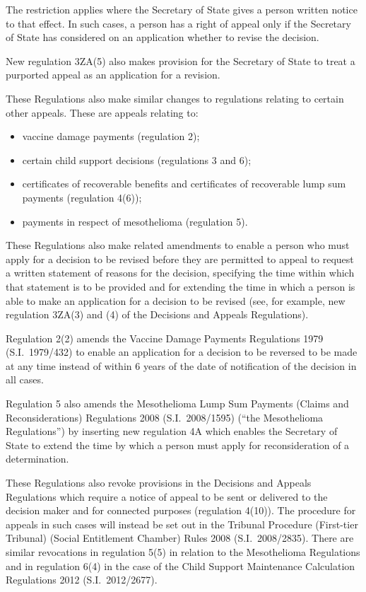 \documentclass[12pt,a4paper]{article}
\begin{document}
The restriction applies where the Secretary of State gives a person written notice to that effect. In such cases, a person has a right of appeal only if the Secretary of State has considered on an application whether to revise the decision.

New regulation 3ZA(5) also makes provision for the Secretary of State to treat a purported appeal as an application for a revision.

These Regulations also make similar changes to regulations relating to certain other appeals. These are appeals relating to:
\begin{itemize}\item
    vaccine damage payments (regulation 2);
\item
    certain child support decisions (regulations 3 and 6);
\item
    certificates of recoverable benefits and certificates of recoverable lump sum payments (regulation 4(6));
\item
    payments in respect of mesothelioma (regulation 5). 
\end{itemize}

These Regulations also make related amendments to enable a person who must apply for a decision to be revised before they are permitted to appeal to request a written statement of reasons for the decision, specifying the time within which that statement is to be provided and for extending the time in which a person is able to make an application for a decision to be revised (see, for example, new regulation 3ZA(3) and (4) of the Decisions and Appeals Regulations).

Regulation 2(2) amends the Vaccine Damage Payments Regulations 1979 (S.I.~1979/432) to enable an application for a decision to be reversed to be made at any time instead of within 6 years of the date of notification of the decision in all cases.

Regulation 5 also amends the Mesothelioma Lump Sum Payments (Claims and Reconsiderations) Regulations 2008 (S.I.~2008/1595) (“the Mesothelioma Regulations”) by inserting new regulation 4A which enables the Secretary of State to extend the time by which a person must apply for reconsideration of a determination.

These Regulations also revoke provisions in the Decisions and Appeals Regulations which require a notice of appeal to be sent or delivered to the decision maker and for connected purposes (regulation 4(10)). The procedure for appeals in such cases will instead be set out in the Tribunal Procedure (First-tier Tribunal) (Social Entitlement Chamber) Rules 2008 (S.I.~2008/2835). There are similar revocations in regulation 5(5) in relation to the Mesothelioma Regulations and in regulation 6(4) in the case of the Child Support Maintenance Calculation Regulations 2012 (S.I.~2012/2677).
\end{document}
